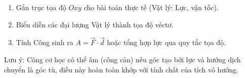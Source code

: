 \begin{enumerate}
\item Gắn trục tọa độ $Oxy$ cho bài toán thực tế (Vật lý: Lực, vận tốc).
\item Biểu diễn các đại lượng Vật lý thành tọa độ véctơ.
\item Tính Công sinh ra $A = \overrightarrow{F} \cdot \overrightarrow{d}$ hoặc tổng hợp lực qua quy tắc tọa độ.
\end{enumerate}
Lưu ý: Công cơ học có thể âm (công cản) nếu góc tạo bởi lực và hướng dịch chuyển là góc tù, điều này hoàn toàn khớp với tính chất của tích vô hướng.
